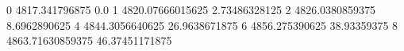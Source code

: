 0 4817.341796875 0.0
1 4820.07666015625 2.73486328125
2 4826.0380859375 8.6962890625
4 4844.3056640625 26.9638671875
6 4856.275390625 38.93359375
8 4863.71630859375 46.37451171875
